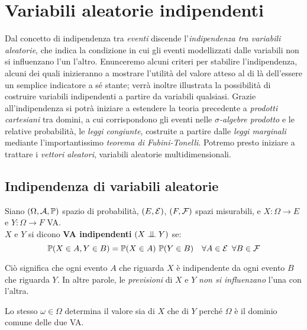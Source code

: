 
\section{Variabili aleatorie indipendenti}
Dal concetto di indipendenza tra \emph{eventi} discende l'\emph{indipendenza tra variabili aleatorie}, che indica la condizione in cui gli eventi modellizzati dalle variabili non si influenzano l'un l'altro.
Enunceremo alcuni criteri per stabilire l'indipendenza, alcuni dei quali inizieranno a mostrare l'utilità del valore atteso al di là dell'essere un semplice indicatore a sé stante; verrà inoltre illustrata la possibilità di costruire variabili indipendenti a partire da variabili qualsiasi.
Grazie all'indipendenza si potrà iniziare a estendere la teoria precedente a \emph{prodotti cartesiani} tra domini, a cui corrispondono gli eventi nelle \emph{$\sigma$-algebre prodotto} e le relative probabilità, le \emph{leggi congiunte}, costruite a partire dalle \emph{leggi marginali} mediante l'importantissimo \emph{teorema di Fubini-Tonelli}.
Potremo presto iniziare a trattare i \emph{vettori aleatori}, variabili aleatorie multidimensionali.


\subsection{Indipendenza di variabili aleatorie}
\begin{defn}
  Siano $(\Omega, \mathcal A, \mathbb P)$ spazio di probabilità, $(E, \mathcal E)$, $(F, \mathcal F)$ spazi misurabili, e $X:\Omega \to E$ e $ Y:\Omega \to F$ VA. \\
  $X$ e $Y$ si dicono \textbf{VA indipendenti} $(X \indep Y)$ se:
  $$\mathbb P(X \in A, Y \in B )= \mathbb P(X \in A) \ \mathbb P(Y \in B)  \quad  \forall A \in \mathcal E \enspace  \forall B \in \mathcal F$$
 \end{defn}
Ciò significa che ogni evento $A$ che riguarda $X$ è indipendente da ogni evento $B$ che riguarda $Y$. In altre parole, le \emph{previsioni} di $X$ e $Y$ \emph{non si influenzano} l'una con l'altra.
\begin{nb}
  Lo stesso $\omega \in \Omega$ determina il valore sia di $X$ che di $Y$ perché $\Omega$ è il dominio comune delle due VA.
\end{nb}

